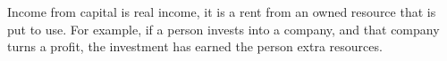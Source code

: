 Income from capital is real income, it is a rent from an owned resource that is put to use.
For example, if a person invests into a company, and that company turns a profit, the investment has earned the person extra resources.